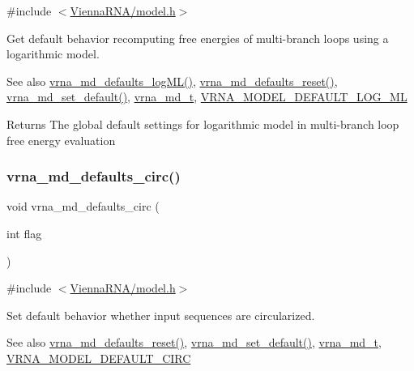 {\ttfamily \#include $<$\mbox{\hyperlink{model_8h}{Vienna\+R\+N\+A/model.\+h}}$>$}



Get default behavior recomputing free energies of multi-\/branch loops using a logarithmic model. 

\begin{DoxySeeAlso}{See also}
\mbox{\hyperlink{group__model__details_ga3de50a73455d88c3957386933b8e1f90}{vrna\+\_\+md\+\_\+defaults\+\_\+log\+M\+L()}}, \mbox{\hyperlink{group__model__details_ga70834424cf804d149937de89f80ceb45}{vrna\+\_\+md\+\_\+defaults\+\_\+reset()}}, \mbox{\hyperlink{group__model__details_ga8ac6ff84936282436f822644bf841f66}{vrna\+\_\+md\+\_\+set\+\_\+default()}}, \mbox{\hyperlink{group__model__details_ga1f8a10e12a0a1915f2a4eff0b28ea17c}{vrna\+\_\+md\+\_\+t}}, \mbox{\hyperlink{group__model__details_ga938f68463e84fe060aa6502f428a517d}{V\+R\+N\+A\+\_\+\+M\+O\+D\+E\+L\+\_\+\+D\+E\+F\+A\+U\+L\+T\+\_\+\+L\+O\+G\+\_\+\+ML}} 
\end{DoxySeeAlso}
\begin{DoxyReturn}{Returns}
The global default settings for logarithmic model in multi-\/branch loop free energy evaluation 
\end{DoxyReturn}
\mbox{\label{group__model__details_ga4e1deb3e91a8a99e5c6dd905a5eb0186}} 
\subsubsection{\texorpdfstring{vrna\_md\_defaults\_circ()}{vrna\_md\_defaults\_circ()}}
{\footnotesize\ttfamily void vrna\+\_\+md\+\_\+defaults\+\_\+circ (\begin{DoxyParamCaption}\item[{int}]{flag }\end{DoxyParamCaption})}



{\ttfamily \#include $<$\mbox{\hyperlink{model_8h}{Vienna\+R\+N\+A/model.\+h}}$>$}



Set default behavior whether input sequences are circularized. 

\begin{DoxySeeAlso}{See also}
\mbox{\hyperlink{group__model__details_ga70834424cf804d149937de89f80ceb45}{vrna\+\_\+md\+\_\+defaults\+\_\+reset()}}, \mbox{\hyperlink{group__model__details_ga8ac6ff84936282436f822644bf841f66}{vrna\+\_\+md\+\_\+set\+\_\+default()}}, \mbox{\hyperlink{group__model__details_ga1f8a10e12a0a1915f2a4eff0b28ea17c}{vrna\+\_\+md\+\_\+t}}, \mbox{\hyperlink{group__model__details_ga22059033db7bcd875c51fec32425490a}{V\+R\+N\+A\+\_\+\+M\+O\+D\+E\+L\+\_\+\+D\+E\+F\+A\+U\+L\+T\+\_\+\+C\+I\+RC}} 
\end{DoxySeeAlso}

